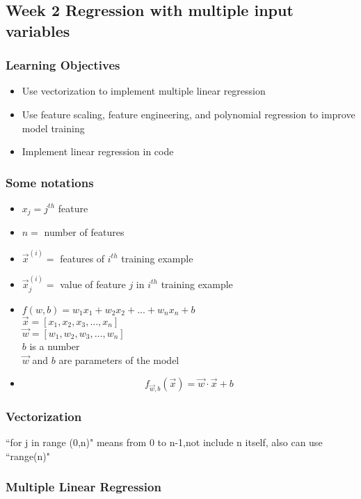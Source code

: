 \documentclass{article}
\begin{document}
    \subsection{Week 2 Regression with multiple input variables}
    \subsubsection{Learning Objectives}
    \begin{itemize}
        \item Use vectorization to implement multiple linear regression
        \item Use feature scaling, feature engineering, and polynomial regression to improve model training
        \item Implement linear regression in code
    \end{itemize}
    \subsubsection*{Some notations}
    \begin{itemize}
	    \item $x_j = j^{th}$ feature
        \item $n = $ number of features
        \item $\vec{x}^{(i)}=$ features of $i^{th}$ training example
        \item $\vec{x}^{(i)}_j=$ value of feature $j$ in $i^{th}$ training example
        \item $f(w,b)=w_1x_1+w_2x_2+...+w_nx_n+b$ \\ 
        $\vec{x}=[x_1,x_2,x_3,...,x_n]$ \\
        $\vec{w}=[w_1,w_2,w_3,...,w_n]$ \\
        $b$ is a number \\
        $\vec{w}$ and $b$ are parameters of the model
        \item $$f_{\vec{w},b}(\vec{x})=\vec{w}\cdot\vec{x}+b$$
    \end{itemize} 
    \subsubsection{Vectorization}
     ``for j in range (0,n)" means from 0 to n-1,not include n itself, also can use ``range(n)"
    \subsubsection{Multiple Linear Regression}
\end{document}
